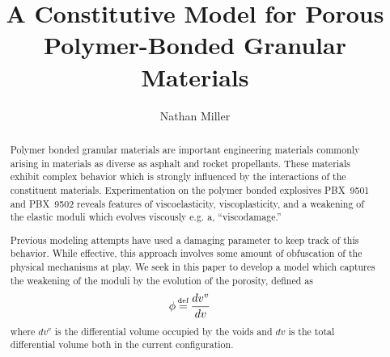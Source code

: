 \documentclass{asme2ej}
\newcommand\defeq{\mathrel{\stackrel{\makebox[0pt]{\mbox{\normalfont\tiny def}}}{=}}}
\begin{document}
\title{A Constitutive Model for Porous Polymer-Bonded Granular Materials}
\author{Nathan Miller}

\maketitle

\begin{abstract}
Polymer bonded granular materials are important engineering materials commonly arising in materials as diverse as asphalt and rocket propellants. These materials exhibit complex behavior which is strongly influenced by the interactions of the constituent materials. Experimentation on the polymer bonded explosives PBX~9501 and PBX~9502 reveals features of viscoelasticity, viscoplasticity, and a weakening of the elastic moduli which evolves viscously e.g. a, ``viscodamage.''

Previous modeling attempts have used a damaging parameter to keep track of this behavior. While effective, this approach involves some amount of obfuscation of the physical mechanisms at play. We seek in this paper to develop a model which captures the weakening of the moduli by the evolution of the porosity, defined as
\begin{align*}
\phi &\defeq \frac{dv^v}{dv}
\end{align*}
where $dv^v$ is the differential volume occupied by the voids and $dv$ is the total differential volume both in the current configuration.
\end{abstract}

%
%
%
%
%
%
%
%
%
%
%





\FloatBarrier



\end{document}
